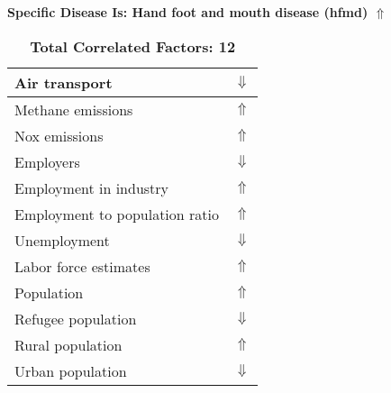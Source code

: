 \documentclass[12pt,notitlepage,oneside]{report}
\begin{document}
\begin{table}[!htb]
\caption{\textbf{Specific Disease Is: Hand foot and mouth disease (hfmd) $\Uparrow$}}
\centering
\label{Correlated Socio-economic Factors0}
\begin{tabular}{|l|l|}
\hline
Air transport  & $\Downarrow$\\ \hline
Methane emissions & $\Uparrow$\\ \hline
Nox emissions & $\Uparrow$\\ \hline
Employers & $\Downarrow$\\ \hline
Employment in industry & $\Uparrow$\\ \hline
Employment to population ratio & $\Uparrow$\\ \hline
Unemployment & $\Downarrow$\\ \hline
Labor force estimates & $\Uparrow$\\ \hline
Population & $\Uparrow$\\ \hline
Refugee population & $\Downarrow$\\ \hline
Rural population & $\Uparrow$\\ \hline
Urban population & $\Downarrow$\\ \hline
\end{tabular}
\caption*{\textbf{Total Correlated Factors: 12}}
\end{table}
\end{document}
